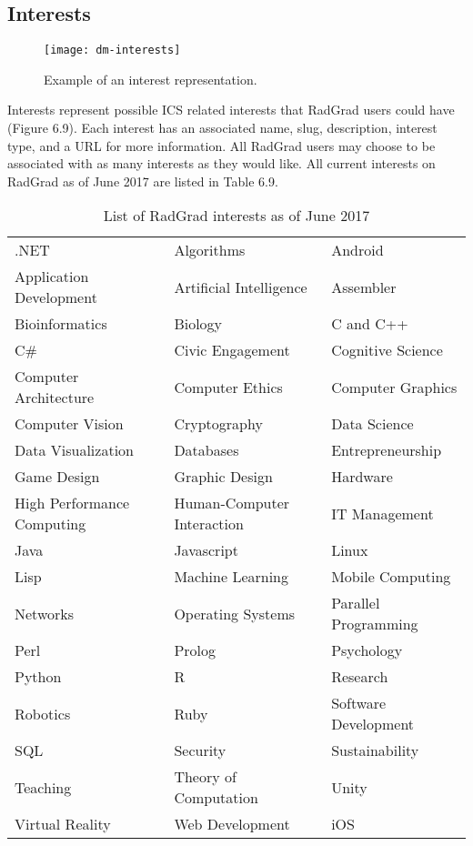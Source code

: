 \subsection{Interests}
\begin{figure}[htbp!]
\centering
\texttt{[image: dm-interests]}
\caption{Example of an interest representation.}
\end{figure}
Interests represent possible ICS related interests that RadGrad users could have (Figure 6.9). Each interest has an associated name, slug, description, interest type, and a URL for more information. All RadGrad users may choose to be associated with as many interests as they would like. All current interests on RadGrad as of June 2017 are listed in Table 6.9.

\begin{table}[htbp!]
\centering
\begin{tabular}{ l l l } 
.NET & Algorithms & Android \\ 
Application Development & Artificial Intelligence & Assembler \\
Bioinformatics & Biology & C and C++ \\
C\# & Civic Engagement & Cognitive Science \\
Computer Architecture & Computer Ethics & Computer Graphics \\
Computer Vision & Cryptography & Data Science \\
Data Visualization & Databases & Entrepreneurship \\
Game Design & Graphic Design & Hardware \\
High Performance Computing & Human-Computer Interaction & IT Management \\
Java & Javascript & Linux \\
Lisp & Machine Learning & Mobile Computing \\
Networks & Operating Systems & Parallel Programming \\
Perl & Prolog & Psychology \\
Python & R & Research \\
Robotics & Ruby & Software Development \\
SQL & Security & Sustainability \\
Teaching & Theory of Computation & Unity \\
Virtual Reality & Web Development & iOS
\end{tabular}
\caption{List of RadGrad interests as of June 2017}
\label{table:2}
\end{table}

